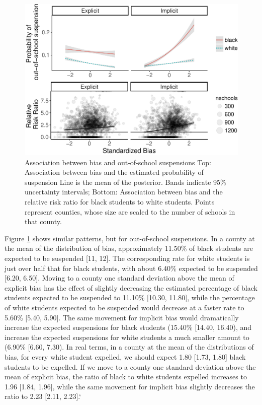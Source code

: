 \documentclass[english,floatsintext,man]{apa6}
\theoremstyle{definition}
\theoremstyle{definition}
\theoremstyle{remark}
\begin{document}
\begin{figure}
\centering
\includegraphics{draft_files/figure-latex/detail-fig-susp-1.pdf}
\caption{\label{fig:detail-fig-susp}Association between bias and
out-of-school suspensions Top: Association between bias and the
estimated probability of suspension Line is the mean of the posterior.
Bands indicate 95\% uncertainty intervals; Bottom: Association between
bias and the relative risk ratio for black students to white students.
Points represent counties, whose size are scaled to the number of
schools in that county.}
\end{figure}

Figure \ref{fig:detail-fig-susp} shows similar patterns, but for
out-of-school suspensions. In a county at the mean of the distribution
of bias, approximately 11.50\% of black students are expected to be
suspended {[}11, 12{]}. The corresponding rate for white students is
just over half that for black students, with about 6.40\% expected to be
suspended {[}6.20, 6.50{]}. Moving to a county one standard deviation
above the mean of explicit bias has the effect of slightly decreasing
the estimated percentage of black students expected to be suspended to
11.10\% {[}10.30, 11.80{]}, while the percentage of white students
expected to be suspended would decrease at a faster rate to 5.60\%
{[}5.40, 5.90{]}. The same movement for implicit bias would dramatically
increase the expected suspensions for black students (15.40\% {[}14.40,
16.40), and increase the expected suspensions for white students a much
smaller amount to (6.90\% {[}6.60, 7.30). In real terms, in a county at
the mean of the distributions of bias, for every white student expelled,
we should expect 1.80 {[}1.73, 1.80{]} black students to be expelled. If
we move to a county one standard deviation above the mean of explicit
bias, the ratio of black to white students expelled increases to 1.96
{[}1.84, 1.96{]}, while the same movement for implicit bias slightly
decreases the ratio to 2.23 {[}2.11, 2.23{]}.`
\end{document}
